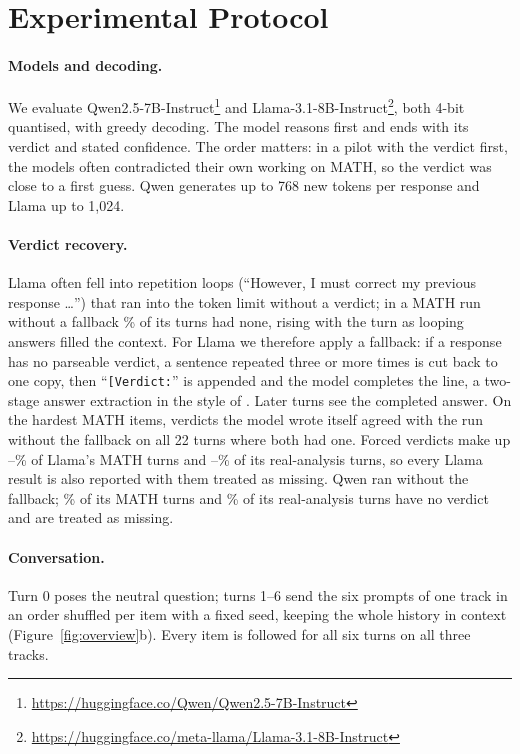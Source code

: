 \section{Experimental Protocol}
\label{sec:method}

\paragraph{Models and decoding.}
We evaluate Qwen2.5-7B-Instruct\footnote{\url{https://huggingface.co/Qwen/Qwen2.5-7B-Instruct}} and Llama-3.1-8B-Instruct\footnote{\url{https://huggingface.co/meta-llama/Llama-3.1-8B-Instruct}}, both 4-bit quantised, with greedy decoding.
The model reasons first and ends with its verdict and stated confidence.
The order matters: in a pilot with the verdict first, the models often contradicted their own working on MATH, so the verdict was close to a first guess.
Qwen generates up to 768 new tokens per response and Llama up to 1{,}024.

\paragraph{Verdict recovery.}
Llama often fell into repetition loops (``However, I must correct my previous response \dots'') that ran into the token limit without a verdict; in a MATH run without a fallback \LlamaMathOldMissing\% of its turns had none, rising with the turn as looping answers filled the context.
For Llama we therefore apply a fallback: if a response has no parseable verdict, a sentence repeated three or more times is cut back to one copy, then ``\texttt{[Verdict:}'' is appended and the model completes the line, a two-stage answer extraction in the style of \citet{kojima2022large}.
Later turns see the completed answer.
On the hardest MATH items, verdicts the model wrote itself agreed with the run without the fallback on all 22 turns where both had one.
Forced verdicts make up \LlamaMathForcedCtrl--\LlamaMathForcedCrit\% of Llama's MATH turns and \LlamaRAForcedCrit--\LlamaRAForcedCtrl\% of its real-analysis turns, so every Llama result is also reported with them treated as missing.
Qwen ran without the fallback; \QwenMathMissing\% of its MATH turns and \QwenRAMissing\% of its real-analysis turns have no verdict and are treated as missing.

\paragraph{Conversation.}
Turn 0 poses the neutral question; turns 1--6 send the six prompts of one track in an order shuffled per item with a fixed seed, keeping the whole history in context (Figure~\ref{fig:overview}b).
Every item is followed for all six turns on all three tracks.

